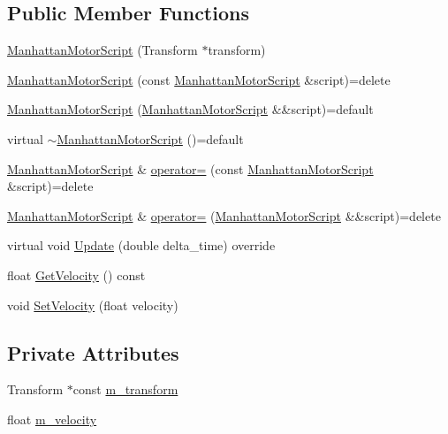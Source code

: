 \subsection*{Public Member Functions}
\begin{DoxyCompactItemize}
\item 
\hyperlink{classmage_1_1_manhattan_motor_script_a0b1e7aba652b7a31b08967bbfbe9920f}{Manhattan\+Motor\+Script} (Transform $\ast$transform)
\item 
\hyperlink{classmage_1_1_manhattan_motor_script_a890f4456d4707e6eb33e43837b26e536}{Manhattan\+Motor\+Script} (const \hyperlink{classmage_1_1_manhattan_motor_script}{Manhattan\+Motor\+Script} \&script)=delete
\item 
\hyperlink{classmage_1_1_manhattan_motor_script_a3076d8c222953233e86202bd78f9504f}{Manhattan\+Motor\+Script} (\hyperlink{classmage_1_1_manhattan_motor_script}{Manhattan\+Motor\+Script} \&\&script)=default
\item 
virtual \hyperlink{classmage_1_1_manhattan_motor_script_abce38dc8f3f6d96b921cced37accf172}{$\sim$\+Manhattan\+Motor\+Script} ()=default
\item 
\hyperlink{classmage_1_1_manhattan_motor_script}{Manhattan\+Motor\+Script} \& \hyperlink{classmage_1_1_manhattan_motor_script_a563d4d429bbcabf25f57539857dde53c}{operator=} (const \hyperlink{classmage_1_1_manhattan_motor_script}{Manhattan\+Motor\+Script} \&script)=delete
\item 
\hyperlink{classmage_1_1_manhattan_motor_script}{Manhattan\+Motor\+Script} \& \hyperlink{classmage_1_1_manhattan_motor_script_a944149dc06764bc23feffde4de100679}{operator=} (\hyperlink{classmage_1_1_manhattan_motor_script}{Manhattan\+Motor\+Script} \&\&script)=delete
\item 
virtual void \hyperlink{classmage_1_1_manhattan_motor_script_aa2aee651ef777e71ac8da8345f86b212}{Update} (double delta\+\_\+time) override
\item 
float \hyperlink{classmage_1_1_manhattan_motor_script_a420ed8a511a6f404056a31245bb7bed0}{Get\+Velocity} () const
\item 
void \hyperlink{classmage_1_1_manhattan_motor_script_a9a21c42e1998dfe18b05d00011db7e7f}{Set\+Velocity} (float velocity)
\end{DoxyCompactItemize}
\subsection*{Private Attributes}
\begin{DoxyCompactItemize}
\item 
Transform $\ast$const \hyperlink{classmage_1_1_manhattan_motor_script_a40573f3df580c3a1b2b7dfe650cc6750}{m\+\_\+transform}
\item 
float \hyperlink{classmage_1_1_manhattan_motor_script_a824893c374fa6f271a964751dc1a59ec}{m\+\_\+velocity}
\end{DoxyCompactItemize}
